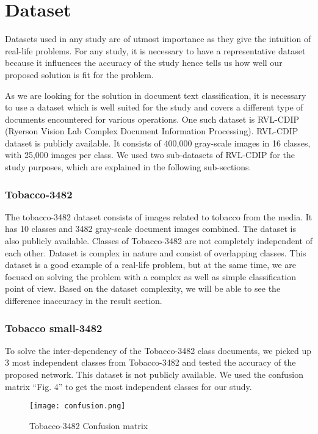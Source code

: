 \documentclass[conference]{IEEEtran}
\begin{document}
\section{Dataset}
Datasets used in any study are of utmost importance as they give the intuition of real-life problems. For any study, it is necessary to have a representative dataset because it influences the accuracy of the study hence tells us how well our proposed solution is fit for the problem. 

As we are looking for the solution in document text classification, it is necessary to use a dataset which is well suited for the study and covers a different type of documents encountered for various operations. One such dataset is RVL-CDIP (Ryerson Vision Lab Complex Document Information Processing). RVL-CDIP dataset is publicly available. It consists of 400,000 gray-scale images in 16 classes, with 25,000 images per class. We used two sub-datasets of RVL-CDIP for the study purposes, which are explained in the following sub-sections.


\subsubsection{Tobacco-3482}
The tobacco-3482 dataset consists of images related to tobacco from the media. It has 10 classes and 3482 gray-scale document images combined. The dataset is also publicly available. Classes of Tobacco-3482 are not completely independent of each other. Dataset is complex in nature and consist of overlapping classes. This dataset is a good example of a real-life problem, but at the same time, we are focused on solving the problem with a complex as well as simple classification point of view. Based on the dataset complexity, we will be able to see the difference inaccuracy in the result section.

\subsubsection{Tobacco small-3482}
To solve the inter-dependency of the Tobacco-3482 class documents, we picked up 3 most independent classes from Tobacco-3482 and tested the accuracy of the proposed network. This dataset is not publicly available. We used the confusion matrix “Fig. 4” to get the most independent classes for our study.

\begin{figure}[htbp]
\centerline{\texttt{[image: confusion.png]}}
\caption{Tobacco-3482 Confusion matrix}
\label{fig}
\end{figure}
\end{document}
